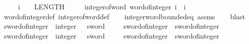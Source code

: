 \begin{isabellebody}
\ \ \ \ \ {\isachardoublequoteopen}i\ {\isasymle}\ {}\ {\isacharcircum}{\kern0pt}\ LENGTH{\isacharparenleft}{\kern0pt}{}{}{\isacharparenright}{\kern0pt}\ {\isacharminus}{\kern0pt}\ {}{\isachardoublequoteclose}\isanewline
\ \ \ {\isachardoublequoteopen}integer{\isacharunderscore}{\kern0pt}of{\isacharunderscore}{\kern0pt}word{}{}\ {\isacharparenleft}{\kern0pt}word{}{}{\isacharunderscore}{\kern0pt}of{\isacharunderscore}{\kern0pt}integer\ i{\isacharparenright}{\kern0pt}\ {\isacharequal}{\kern0pt}\ i{\isachardoublequoteclose}\isanewline
%
\isadelimproof
\ \ %
\endisadelimproof
%
\isatagproof
{}\isamarkupfalse%
\ word{}{}{\isacharunderscore}{\kern0pt}of{\isacharunderscore}{\kern0pt}integer{\isacharunderscore}{\kern0pt}def\ integer{\isacharunderscore}{\kern0pt}of{\isacharunderscore}{\kern0pt}word{}{}{\isacharunderscore}{\kern0pt}def\isanewline
\ \ \isamarkupfalse%
\ integer{\isacharunderscore}{\kern0pt}word{\isacharunderscore}{\kern0pt}bounded{\isacharunderscore}{\kern0pt}eq\ assms\isanewline
\ \ \isamarkupfalse%
\ blast%
\endisatagproof
{\isafoldproof}%
%
\isadelimproof
\isanewline
%
\endisadelimproof
\isanewline
{}\isamarkupfalse%
\ sword{}{\isacharunderscore}{\kern0pt}of{\isacharunderscore}{\kern0pt}integer\ {\isacharcolon}{\kern0pt}{\isacharcolon}{\kern0pt}\ {\isachardoublequoteopen}integer\ {\isasymRightarrow}\ {}\ sword{\isachardoublequoteclose}\isanewline
\ \ \isanewline
\ \ {\isachardoublequoteopen}sword{}{\isacharunderscore}{\kern0pt}of{\isacharunderscore}{\kern0pt}integer\ {\isasymequiv}\ sword{\isacharunderscore}{\kern0pt}of{\isacharunderscore}{\kern0pt}integer{\isachardoublequoteclose}\isanewline
\isanewline
{}\isamarkupfalse%
\ sword{}{}{\isacharunderscore}{\kern0pt}of{\isacharunderscore}{\kern0pt}integer\ {\isacharcolon}{\kern0pt}{\isacharcolon}{\kern0pt}\ {\isachardoublequoteopen}integer\ {\isasymRightarrow}\ {}{}\ sword{\isachardoublequoteclose}\isanewline
\ \ \isanewline
\ \ {\isachardoublequoteopen}sword{}{}{\isacharunderscore}{\kern0pt}of{\isacharunderscore}{\kern0pt}integer\ {\isasymequiv}\ sword{\isacharunderscore}{\kern0pt}of{\isacharunderscore}{\kern0pt}integer{\isachardoublequoteclose}\isanewline
\isanewline
{}\isamarkupfalse%

\end{isabellebody}
